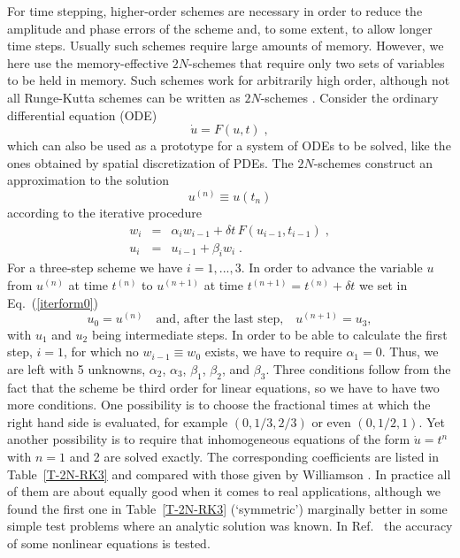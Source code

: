 \documentclass[\mydriver,12pt,twoside,notitlepage,a4paper]{article}
\newcommand{\Eq}[1]{Eq.~(\ref{#1})}
\begin{document}
For time stepping, higher-order schemes are necessary in order to reduce
the amplitude and phase errors of the scheme and, to some extent, to allow
longer time steps.
Usually such schemes require large amounts of memory.
However, we here use the memory-effective $2N$-schemes that require only
two sets of variables to be held in memory.
Such schemes work for
arbitrarily high order, although not all Runge-Kutta schemes can be
written as $2N$-schemes \cite{2Nstorage,SH88}.
Consider the ordinary differential equation (ODE)
\begin{equation}
  \dot{u} = F(u,t) \; ,
\end{equation}
which can also be used as a prototype for a system of ODEs to be solved,
like the ones obtained by spatial discretization of PDEs.
The $2N$-schemes construct an approximation to the solution
\begin{equation}
  u^{(n)} \equiv u(t_n)
\end{equation}
according to the iterative procedure
\begin{eqnarray}
  w_i &=& \alpha_i w_{i-1}+\delta t\,F(u_{i-1},t_{i-1}) \;, \\
  u_i &=& u_{i-1}+\beta_i w_i \;.
\label{iterform0}
\end{eqnarray}
For a three-step scheme we have $i=1,...,3$.
In order to advance the variable $u$ from $u^{(n)}$ at time $t^{(n)}$
to $u^{(n+1)}$ at time $t^{(n+1)}=t^{(n)}+\delta t$ we set in \Eq{iterform0}
\begin{equation}
  u_0=u^{(n)}
  \quad\mbox{and, after the last step,}\quad
  u^{(n+1)}=u_3,
\end{equation}
with $u_1$ and $u_2$ being intermediate steps. In order to be able to
calculate the first step, $i=1$, for which no $w_{i-1}\equiv w_0$ exists,
we have to require $\alpha_1=0$. Thus, we are left with 5 unknowns,
$\alpha_2$, $\alpha_3$, $\beta_1$, $\beta_2$, and $\beta_3$. Three
conditions follow from the fact that the scheme be third order
for linear equations, so we
have to have two more conditions. One possibility is to choose the
fractional times at which the right hand side is evaluated, for
example $(0,1/3,2/3)$ or even $(0,1/2,1)$.
Yet another possibility is to require that
inhomogeneous equations of the form $\dot{u}=t^n$ with $n=1$ and 2 are
solved exactly.
The corresponding coefficients are listed in Table~\ref{T-2N-RK3} and compared
with those given by Williamson \cite{2Nstorage}. In practice all of them
are about equally good when it comes to real applications, although
we found the first one in Table~\ref{T-2N-RK3} (`symmetric') marginally better in some
simple test problems where an analytic solution was known.
In Ref.~\cite{Ref-1} the accuracy of some nonlinear equations is tested.
\end{document}
